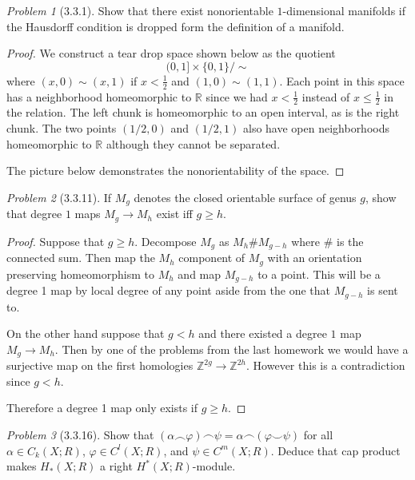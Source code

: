 \documentclass[10pt]{article}
\newcommand{\sk}{\vskip 10mm}
\newcommand{\bb}[1]{\mathbb{#1}}
\theoremstyle{remark}
\newtheorem{problem}{Problem}
\begin{document}
\begin{problem}[3.3.1]
  Show that there exist nonorientable $1$-dimensional manifolds if the Hausdorff
  condition is dropped form the definition of a manifold.
\end{problem}

\begin{proof}
  We construct a tear drop space shown below as the quotient
  \[
    (0,1] \times\{0,1\}/\sim
  \]
  where $(x,0)\sim(x,1)$ if $x<\frac{1}{2}$ and $(1,0)\sim (1,1)$. Each
  point in this space has a neighborhood homeomorphic to $\bb{R}$ since
  we had $x<\frac{1}{2}$ instead of $x\leq\frac{1}{2}$ in the relation.
  The left chunk is homeomorphic to an open interval, as is the right chunk.
  The two points $(1/2,0)$ and $(1/2,1)$ also have open neighborhoods
  homeomorphic to $\bb{R}$ although they cannot be separated.

  The picture below demonstrates the nonorientability of the space.
  \vskip1in
\end{proof}

\sk

\begin{problem}[3.3.11]
  If $M_g$ denotes the closed orientable surface of genus $g$, show
  that degree $1$ maps $M_g\rightarrow M_h$ exist iff $g\geq h$.
\end{problem}

\begin{proof}
  Suppose that $g\geq h$. Decompose $M_g$ as $M_h\#M_{g-h}$ where
  $\#$ is the connected sum. Then map the $M_h$ component of $M_g$
  with an orientation preserving homeomorphism to $M_h$ and map
  $M_{g-h}$ to a point. This will be a degree 1 map by local degree
  of any point aside from the one that $M_{g-h}$ is sent to.

  On the other hand suppose that $g< h$ and there existed
  a degree $1$ map $M_g\rightarrow M_h$. Then by one of the problems
  from the last homework we would have a surjective map on the
  first homologies $\bb{Z}^{2g}\rightarrow \bb{Z}^{2h}$. However this is a
  contradiction since $g<h$.

  Therefore a degree 1 map only exists if $g\geq h$.
\end{proof}

\sk

\begin{problem}[3.3.16]
  Show that
  $(\alpha\smallfrown \varphi)\smallfrown \psi=\alpha\smallfrown (\varphi\smallsmile \psi)$
  for all $\alpha\in C_k(X;R)$, $\varphi\in C^l(X;R)$, and $\psi\in C^m(X;R)$.
  Deduce that cap product makes $H_*(X;R)$ a right $H^*(X;R)$-module.
\end{problem}
\end{document}
